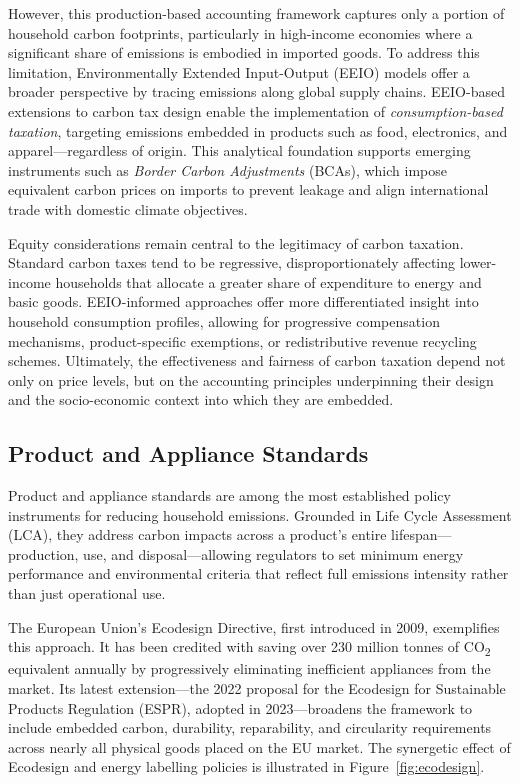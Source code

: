 \documentclass[12pt,a4paper]{article}%
\begin{document}
However, this production-based accounting framework captures only a portion of household carbon footprints, particularly in high-income economies where a significant share of emissions is embodied in imported goods. To address this limitation, Environmentally Extended Input-Output (EEIO) models offer a broader perspective by tracing emissions along global supply chains. EEIO-based extensions to carbon tax design enable the implementation of \textit{consumption-based taxation}, targeting emissions embedded in products such as food, electronics, and apparel---regardless of origin. This analytical foundation supports emerging instruments such as \textit{Border Carbon Adjustments} (BCAs), which impose equivalent carbon prices on imports to prevent leakage and align international trade with domestic climate objectives.

Equity considerations remain central to the legitimacy of carbon taxation. Standard carbon taxes tend to be regressive, disproportionately affecting lower-income households that allocate a greater share of expenditure to energy and basic goods. EEIO-informed approaches offer more differentiated insight into household consumption profiles, allowing for progressive compensation mechanisms, product-specific exemptions, or redistributive revenue recycling schemes. Ultimately, the effectiveness and fairness of carbon taxation depend not only on price levels, but on the accounting principles underpinning their design and the socio-economic context into which they are embedded.


\subsection{Product and Appliance Standards}

Product and appliance standards are among the most established policy instruments for reducing household emissions. Grounded in Life Cycle Assessment (LCA), they address carbon impacts across a product’s entire lifespan—production, use, and disposal—allowing regulators to set minimum energy performance and environmental criteria that reflect full emissions intensity rather than just operational use.

The European Union’s Ecodesign Directive, first introduced in 2009, exemplifies this approach. It has been credited with saving over 230 million tonnes of CO\textsubscript{2} equivalent annually by progressively eliminating inefficient appliances from the market. Its latest extension—the 2022 proposal for the Ecodesign for Sustainable Products Regulation (ESPR), adopted in 2023—broadens the framework to include embedded carbon, durability, reparability, and circularity requirements across nearly all physical goods placed on the EU market. The synergetic effect of Ecodesign and energy labelling policies is illustrated in Figure~\ref{fig:ecodesign}.
\end{document}
